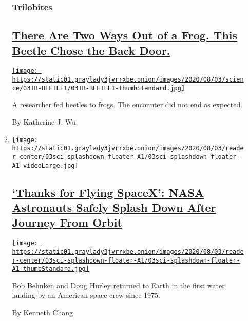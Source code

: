 \begin{enumerate}
\begin{enumerate}
    \hypertarget{trilobites}{%
    \subsubsection{Trilobites}\label{trilobites}}

    \hypertarget{there-are-two-ways-out-of-a-frog-this-beetle-chose-the-back-door}{%
    \subsection{\texorpdfstring{\href{/2020/08/03/science/beetle-frog-poop.html}{There
    Are Two Ways Out of a Frog. This Beetle Chose the Back
    Door.}}{There Are Two Ways Out of a Frog. This Beetle Chose the Back Door.}}\label{there-are-two-ways-out-of-a-frog-this-beetle-chose-the-back-door}}

    \href{/2020/08/03/science/beetle-frog-poop.html}{\texttt{[image: https://static01.graylady3jvrrxbe.onion/images/2020/08/03/science/03TB-BEETLE1/03TB-BEETLE1-thumbStandard.jpg]}}

    A researcher fed beetles to frogs. The encounter did not end as
    expected.

    By Katherine J. Wu
  \item
    \texttt{[image: https://static01.graylady3jvrrxbe.onion/images/2020/08/03/reader-center/03sci-splashdown-floater-A1/03sci-splashdown-floater-A1-videoLarge.jpg]}

    \hypertarget{thanks-for-flying-spacex-nasa-astronauts-safely-splash-down-after-journey-from-orbit}{%
    \subsection{\texorpdfstring{\href{/2020/08/02/science/spacex-astronauts-splashdown.html}{`Thanks
    for Flying SpaceX': NASA Astronauts Safely Splash Down After Journey
    From
    Orbit}}{`Thanks for Flying SpaceX': NASA Astronauts Safely Splash Down After Journey From Orbit}}\label{thanks-for-flying-spacex-nasa-astronauts-safely-splash-down-after-journey-from-orbit}}

    \href{/2020/08/02/science/spacex-astronauts-splashdown.html}{\texttt{[image: https://static01.graylady3jvrrxbe.onion/images/2020/08/03/reader-center/03sci-splashdown-floater-A1/03sci-splashdown-floater-A1-thumbStandard.jpg]}}

    Bob Behnken and Doug Hurley returned to Earth in the first water
    landing by an American space crew since 1975.

    By Kenneth Chang
  \end{enumerate}
\end{enumerate}

